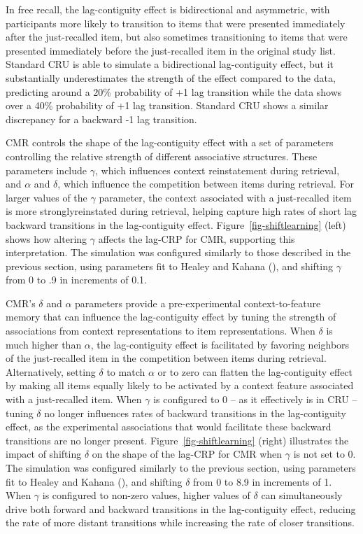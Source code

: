 \documentclass[
  man,
  floatsintext,
  longtable,
  nolmodern,
  notxfonts,
  notimes,
  draftfirst,
  colorlinks=true,linkcolor=blue,citecolor=blue,urlcolor=blue]{apa7}
\begin{document}
In free recall, the lag-contiguity effect is bidirectional and
asymmetric, with participants more likely to transition to items that
were presented immediately after the just-recalled item, but also
sometimes transitioning to items that were presented immediately before
the just-recalled item in the original study list. Standard CRU is able
to simulate a bidirectional lag-contiguity effect, but it substantially
underestimates the strength of the effect compared to the data,
predicting around a 20\% probability of +1 lag transition while the data
shows over a 40\% probability of +1 lag transition. Standard CRU shows a
similar discrepancy for a backward -1 lag transition.

CMR controls the shape of the lag-contiguity effect with a set of
parameters controlling the relative strength of different associative
structures. These parameters include \(\gamma\), which influences
context reinstatement during retrieval, and \(\alpha\) and \(\delta\),
which influence the competition between items during retrieval. For
larger values of the \(\gamma\) parameter, the context associated with a
just-recalled item is more stronglyreinstated during retrieval, helping
capture high rates of short lag backward transitions in the
lag-contiguity effect. Figure~\ref{fig-shiftlearning} (left) shows how
altering \(\gamma\) affects the lag-CRP for CMR, supporting this
interpretation. The simulation was configured similarly to those
described in the previous section, using parameters fit to Healey and
Kahana (), and shifting \(\gamma\)
from 0 to .9 in increments of 0.1.

CMR's \(\delta\) and \(\alpha\) parameters provide a pre-experimental
context-to-feature memory that can influence the lag-contiguity effect
by tuning the strength of associations from context representations to
item representations. When \(\delta\) is much higher than \(\alpha\),
the lag-contiguity effect is facilitated by favoring neighbors of the
just-recalled item in the competition between items during retrieval.
Alternatively, setting \(\delta\) to match \(\alpha\) or to zero can
flatten the lag-contiguity effect by making all items equally likely to
be activated by a context feature associated with a just-recalled item.
When \(\gamma\) is configured to 0 -- as it effectively is in CRU --
tuning \(\delta\) no longer influences rates of backward transitions in
the lag-contiguity effect, as the experimental associations that would
facilitate these backward transitions are no longer present.
Figure~\ref{fig-shiftlearning} (right) illustrates the impact of
shifting \(\delta\) on the shape of the lag-CRP for CMR when \(\gamma\)
is not set to 0. The simulation was configured similarly to the previous
section, using parameters fit to Healey and Kahana
(), and shifting \(\delta\) from 0
to 8.9 in increments of 1. When \(\gamma\) is configured to non-zero
values, higher values of \(\delta\) can simultaneously drive both
forward and backward transitions in the lag-contiguity effect, reducing
the rate of more distant transitions while increasing the rate of closer
transitions.
\end{document}
